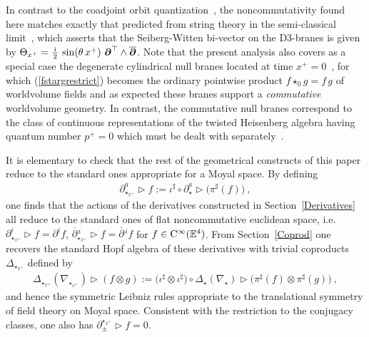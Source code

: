 \documentclass[11pt,a4paper]{article}
\newcommand{\1}{\mathbb{1}}
\newcommand{\mbf}[1]{{\boldsymbol {#1} }}
\def\ii{{\,{\rm i}\,}}
\def\CC{{\rm C}}
\def\mdell{{\mbf\partial}}
\newcommand{\eucl}{{\mathbb E}}
\newcommand{\beq}{\begin{eqnarray}}
\newcommand{\eeq}{\end{eqnarray}}
\begin{document}
In contrast to the coadjoint orbit quantization~\cite{HSz1}, the
noncommutativity found here matches exactly that predicted from string
theory in the semi-classical limit~\cite{DAK1}, which asserts that the
Seiberg-Witten bi-vector on the D3-branes is given by
$\Theta_{x^+}=\frac\ii2\,\sin(\theta\,x^+)~\mdell^\top\wedge
\overline{\mdell}$. Note that the present analysis also covers as a
special case the degenerate cylindrical null branes located at time
$x^+=0$~\cite{SF-OF1}, for which (\ref{fstargrestrict}) becomes the
ordinary pointwise product $f\star_0g=f\,g$ of worldvolume fields and
as expected these branes support a {\it commutative} worldvolume
geometry. In contrast, the commutative null branes correspond to the
class of continuous representations of the twisted Heisenberg algebra
having quantum number $p^+=0$ which must be dealt with
separately~\cite{HSz1}.

It is elementary to check that the rest of the geometrical constructs
of this paper reduce to the standard ones appropriate for a Moyal
space. By defining
\beq
\partial_{\star_{x^+}}^a\triangleright
f:=\iota^\sharp\circ\partial_\star^a\triangleright\bigl(\pi^\sharp(f)\bigr) \
,
\label{derivxpdef}\eeq
one finds that the actions of the derivatives constructed in
Section~\ref{Derivatives} all reduce to the standard ones of flat
noncommutative euclidean space,
i.e. $\partial_{\star_{x^+}}^i\triangleright f=\partial^if$,
$\overline{\partial}{}^{\,i}_{\star_{x^+}}\triangleright
f=\overline{\partial}{}^{\,i}f$ for
$f\in\CC^\infty(\eucl^4)$. From Section~\ref{Coprod} one recovers the
standard Hopf algebra of these derivatives with trivial coproducts
$\Delta_{\star_{x^+}}$ defined by
\beq
\Delta_{\star_{x^+}}(\nabla_{\star_{x^+}})\triangleright
(f\otimes g):=\bigl(\iota^\sharp\otimes\iota^\sharp\bigr)\circ
\Delta_\star(\nabla_\star)
\triangleright\bigl(\pi^\sharp(f)\otimes\pi^\sharp(g)\bigr) \ ,
\label{Deltaxpdef}\eeq
and hence the symmetric Leibniz rules appropriate to the translational
symmetry of field theory on Moyal space. Consistent
with the restriction to the conjugacy classes, one also has
$\partial_\pm^{\star_{x^+}}\triangleright f=0$.
\end{document}
